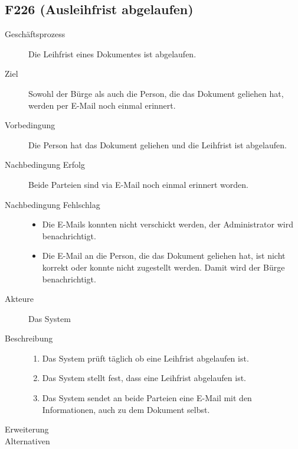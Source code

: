 \subsection{F226 (Ausleihfrist abgelaufen)}
\begin{description}
  \item[Geschäftsprozess]Die Leihfrist eines Dokumentes ist abgelaufen.
  \item[Ziel]Sowohl der Bürge als auch die Person, die das Dokument geliehen hat, werden per E-Mail noch einmal erinnert.
  \item[Vorbedingung]Die Person hat das Dokument geliehen und die Leihfrist ist abgelaufen.
  \item[Nachbedingung Erfolg]Beide Parteien sind via E-Mail noch einmal erinnert worden.
  \item[Nachbedingung Fehlschlag]\hfill
    \begin{itemize}
      \item Die E-Mails konnten nicht verschickt werden, der Administrator wird benachrichtigt.
      \item Die E-Mail an die Person, die das Dokument geliehen hat, ist nicht korrekt oder konnte nicht zugestellt werden. Damit wird der Bürge benachrichtigt.
    \end{itemize}
  \item[Akteure]Das System
  \item[Beschreibung]\hfill
    \begin{enumerate}
      \item Das System prüft täglich ob eine Leihfrist abgelaufen ist.
      \item Das System stellt fest, dass eine Leihfrist abgelaufen ist.
      \item Das System sendet an beide Parteien eine E-Mail mit den Informationen, auch zu dem Dokument selbst.
    
    \end{enumerate}
  \item[Erweiterung]
  \item[Alternativen]
\end{description}

